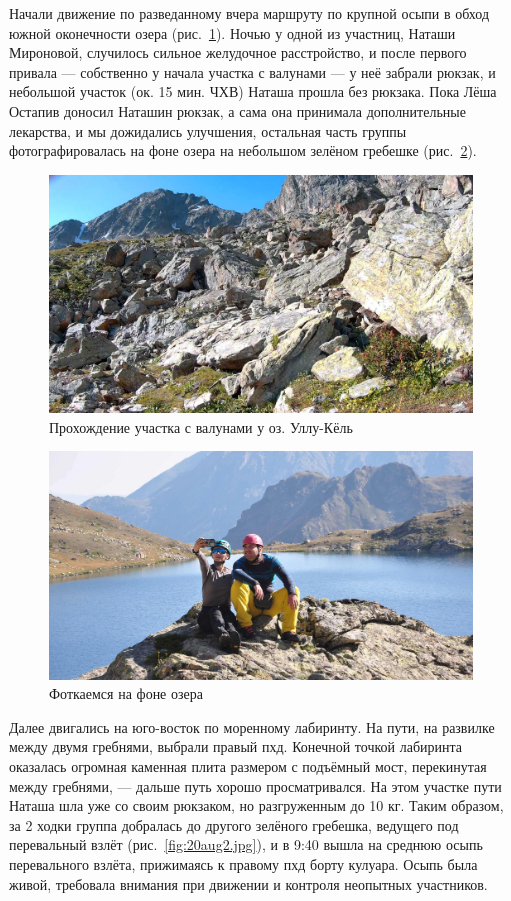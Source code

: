 Начали движение по разведанному вчера маршруту по крупной осыпи в обход южной оконечности озера (рис.~\ref{ullu_koel_lake_stones}). Ночью у одной из участниц, Наташи Мироновой, случилось сильное желудочное расстройство, и после первого  привала --- собственно у начала участка с валунами --- у неё забрали рюкзак, и небольшой участок (ок. 15 мин. ЧХВ) Наташа прошла без рюкзака. Пока Лёша Остапив доносил Наташин рюкзак, а сама она принимала дополнительные лекарства, и мы дожидались улучшения, остальная часть группы фотографировалась на фоне озера на небольшом зелёном гребешке (рис.~\ref{fig:DSC_0907}).
\begin{figure}[h!]
	\centering
	\includegraphics[width=0.7\linewidth]{../pics/ullu_koel_lake_stones.jpg}
	\caption{Прохождение участка с валунами у оз. Уллу-Кёль}
	\label{ullu_koel_lake_stones}
\end{figure}
 
\begin{figure}[h!]
 \centering
 \includegraphics[width=0.7\linewidth]{../pics/DSC_0907}
 \caption{Фоткаемся на фоне озера}
 \label{fig:DSC_0907}
\end{figure}

Далее двигались на юго-восток по моренному лабиринту. На пути, на развилке между двумя гребнями, выбрали правый пхд. Конечной точкой лабиринта оказалась огромная каменная плита размером с подъёмный мост, перекинутая между гребнями, --- дальше путь хорошо просматривался. На этом участке пути Наташа шла уже со своим рюкзаком, но разгруженным до 10 кг. Таким образом, за 2 ходки группа добралась до другого зелёного гребешка, ведущего под перевальный взлёт (рис.~\ref{fig:20aug2.jpg}), и в 9:40 вышла на среднюю осыпь перевального взлёта, прижимаясь к правому пхд борту кулуара. Осыпь была живой, требовала внимания при движении и контроля неопытных участников.

